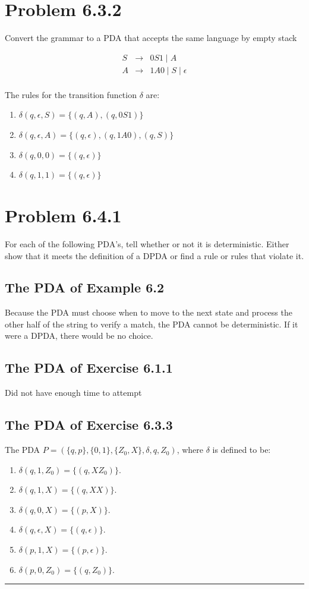 \documentclass[20pt]{article} %
\begin{document}
\section{Problem 6.3.2}
Convert the grammar to a PDA that accepts the same language by empty stack \\
 \begin{table}[!htbp]
 \[\begin{array}{ccc} 
 S & \rightarrow & 0S1 \mid A \\
 A & \rightarrow & 1A0 \mid S \mid \epsilon \\
 \end{array}\]
 \end{table}
The rules for the transition function $\delta$ are: \\
\begin{enumerate}
\item $\delta(q, \epsilon, S) = \{(q, A), (q, 0S1)\}$
\item $\delta(q, \epsilon, A) = \{(q, \epsilon), (q, 1A0), (q, S)\}$
\item $\delta(q, 0, 0) = \{(q, \epsilon)\}$
\item $\delta(q, 1, 1) = \{(q, \epsilon)\}$
\end{enumerate}
\newpage
\section{Problem 6.4.1}
For each of the following PDA's, tell whether or not it is deterministic.  Either show that it meets the definition of a DPDA or find a rule or rules that violate it.
\subsection{The PDA of Example 6.2}
Because the PDA must choose when to move to the next state and process the other half of the string to verify a match, the PDA cannot be deterministic. If it were a DPDA, there would be no choice.
\subsection{The PDA of Exercise 6.1.1}
Did not have enough time to attempt
\subsection{The PDA of Exercise 6.3.3}
The PDA $\!P = (\{q, p\}, \{0,1\}, \{Z_0,X\}, \delta, q , Z_0)$, where  $\delta$ is defined to be:
\begin{enumerate}
\item $\delta(q, 1, Z_0) = \{(q, XZ_0)\}$.
\item $\delta(q, 1, X) = \{(q, XX)\}$.
\item $\delta(q, 0, X) = \{(p, X)\}$.
\item $\delta(q, \epsilon, X) = \{(q, \epsilon)\}$.
\item $\delta(p, 1, X) = \{(p, \epsilon)\}$.
\item $\delta(p, 0, Z_0) = \{(q, Z_0)\}$.
\end{enumerate}
\noindent\rule{2cm}{0.4pt} \\
\end{document}
